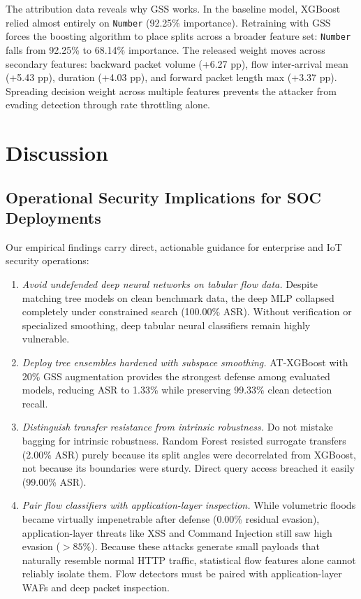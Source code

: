 \documentclass[iicol,pdflatex,sn-mathphys-num]{sn-jnl}
\begin{document}
The attribution data reveals why GSS works. In the baseline model, XGBoost relied almost entirely on \texttt{Number} (92.25\% importance). Retraining with GSS forces the boosting algorithm to place splits across a broader feature set: \texttt{Number} falls from 92.25\% to 68.14\% importance. The released weight moves across secondary features: backward packet volume (+6.27 pp), flow inter-arrival mean (+5.43 pp), duration (+4.03 pp), and forward packet length max (+3.37 pp). Spreading decision weight across multiple features prevents the attacker from evading detection through rate throttling alone.

\section{Discussion}
\label{sec:discussion}

\subsection{Operational Security Implications for SOC Deployments}
Our empirical findings carry direct, actionable guidance for enterprise and IoT security operations:
\begin{enumerate}
    \item \textit{Avoid undefended deep neural networks on tabular flow data.} Despite matching tree models on clean benchmark data, the deep MLP collapsed completely under constrained search (100.00\% ASR). Without verification or specialized smoothing, deep tabular neural classifiers remain highly vulnerable.
    \item \textit{Deploy tree ensembles hardened with subspace smoothing.} AT-XGBoost with 20\% GSS augmentation provides the strongest defense among evaluated models, reducing ASR to 1.33\% while preserving 99.33\% clean detection recall.
    \item \textit{Distinguish transfer resistance from intrinsic robustness.} Do not mistake bagging for intrinsic robustness. Random Forest resisted surrogate transfers (2.00\% ASR) purely because its split angles were decorrelated from XGBoost, not because its boundaries were sturdy. Direct query access breached it easily (99.00\% ASR).
    \item \textit{Pair flow classifiers with application-layer inspection.} While volumetric floods became virtually impenetrable after defense (0.00\% residual evasion), application-layer threats like XSS and Command Injection still saw high evasion ($>85\%$). Because these attacks generate small payloads that naturally resemble normal HTTP traffic, statistical flow features alone cannot reliably isolate them. Flow detectors must be paired with application-layer WAFs and deep packet inspection.
\end{enumerate}
\end{document}
